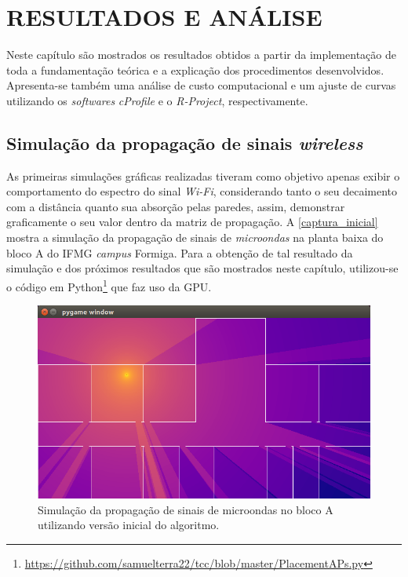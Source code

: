 \documentclass[
	12pt,				%
	twoside,			%
	a4paper,			%
	english,			%
	french,				%
	spanish,			%
	brazil				%
	]{abntex2}
\begin{document}
\chapter{RESULTADOS E ANÁLISE}\label{sec:resultados}

Neste capítulo são mostrados os resultados obtidos a partir da
implementação de toda a fundamentação teórica e a explicação dos
procedimentos desenvolvidos. Apresenta-se também uma análise de custo
computacional e um ajuste de curvas utilizando os \emph{softwares}
\emph{cProfile} e o \emph{R-Project}, respectivamente.

\section{\texorpdfstring{Simulação da propagação de sinais
\emph{wireless}}{Simulação da propagação de sinais wireless}}\label{simulauxe7uxe3o-da-propagauxe7uxe3o-de-sinais-wireless}

As primeiras simulações gráficas realizadas tiveram como objetivo apenas
exibir o comportamento do espectro do sinal \emph{Wi-Fi}, considerando
tanto o seu decaimento com a distância quanto sua absorção pelas
paredes, assim, demonstrar graficamente o seu valor dentro da matriz de
propagação. A \autoref{captura_inicial} mostra a simulação da propagação
de sinais de \emph{microondas} na planta baixa do bloco A do IFMG
\emph{campus} Formiga. Para a obtenção de tal resultado da simulação e
dos próximos resultados que são mostrados neste capítulo, utilizou-se o
código em Python\footnote{\url{https://github.com/samuelterra22/tcc/blob/master/PlacementAPs.py}}
que faz uso da GPU.

\begin{figure}[ht]
    \caption{\label{captura_inicial} Simulação da propagação de sinais de microondas no bloco A utilizando versão inicial do algoritmo.}
    \begin{center}
        \includegraphics[scale=0.6]{imagens/captura-inicial.jpg}
    \end{center}
\end{figure}
\end{document}

